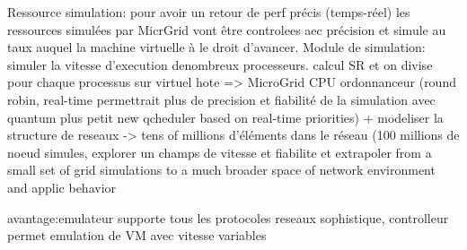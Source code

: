 Ressource simulation:
pour avoir un retour de perf précis (temps-réel) les ressources simulées par MicrGrid vont être controlees aec précision et simule au taux auquel la machine virtuelle à le droit d'avancer.
Module de simulation: simuler la vitesse d'execution denombreux processeurs. calcul SR  et on divise pour chaque processus sur virtuel hote => MicroGrid CPU ordonnanceur (round robin, real-time permettrait plus de precision et fiabilité de la simulation avec quantum plus petit new qcheduler based on real-time priorities) + modeliser la structure de reseaux -> tens of millions d'éléments dans le réseau (100 millions de noeud simules, explorer un champs de vitesse et fiabilite et extrapoler  from a small set of grid simulations to a much broader space of network environment and applic behavior

avantage:emulateur supporte tous les protocoles reseaux sophistique, controlleur permet emulation de VM avec vitesse variables

